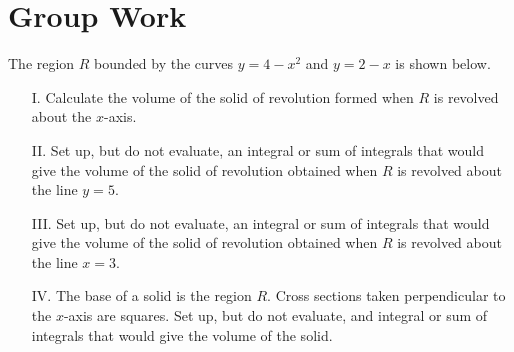 \documentclass[handout]{ximera}
\begin{document}
\section{Group Work}

\begin{problem}
The region $R$ bounded by the curves $y=4-x^2$ and $y=2-x$ is shown below.

\begin{image}
\end{image}

\begin{itemize}
\item[I.] Calculate the volume of the solid of revolution formed when $R$ is revolved about the $x$-axis.
\item[II.] Set up, but do not evaluate, an integral or sum of integrals that would give the volume of the solid of revolution obtained when $R$ is revolved about the line $y=5$.
\item[III.] Set up, but do not evaluate, an integral or sum of integrals that would give the volume of the solid of revolution obtained when $R$ is revolved about the line $x=3$.
\item[IV.] The base of a solid is the region $R$.  Cross sections taken perpendicular to the $x$-axis are squares.  Set up, but do not evaluate, and integral or sum of integrals that would give the volume of the solid.
\end{itemize}
\end{problem}
\end{document}

